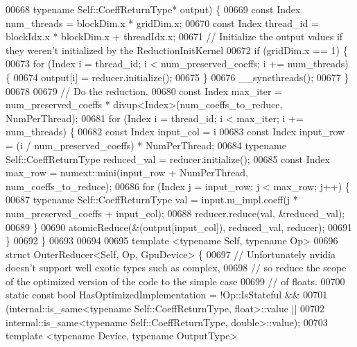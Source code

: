 \begin{DoxyCode}
00668                                      \textcolor{keyword}{typename} Self::CoeffReturnType* output) \{
00669   \textcolor{keyword}{const} Index num\_threads = blockDim.x * gridDim.x;
00670   \textcolor{keyword}{const} Index thread\_id = blockIdx.x * blockDim.x + threadIdx.x;
00671   \textcolor{comment}{// Initialize the output values if they weren't initialized by the ReductionInitKernel}
00672   \textcolor{keywordflow}{if} (gridDim.x == 1) \{
00673     \textcolor{keywordflow}{for} (Index i = thread\_id; i < num\_preserved\_coeffs; i += num\_threads) \{
00674       output[i] = reducer.initialize();
00675     \}
00676     \_\_syncthreads();
00677   \}
00678 
00679   \textcolor{comment}{// Do the reduction.}
00680   \textcolor{keyword}{const} Index max\_iter = num\_preserved\_coeffs * divup<Index>(num\_coeffs\_to\_reduce, NumPerThread);
00681   \textcolor{keywordflow}{for} (Index i = thread\_id; i < max\_iter; i += num\_threads) \{
00682     \textcolor{keyword}{const} Index input\_col = i %
00683     \textcolor{keyword}{const} Index input\_row = (i / num\_preserved\_coeffs) * NumPerThread;
00684     \textcolor{keyword}{typename} Self::CoeffReturnType reduced\_val = reducer.initialize();
00685     \textcolor{keyword}{const} Index max\_row = numext::mini(input\_row + NumPerThread, num\_coeffs\_to\_reduce);
00686     \textcolor{keywordflow}{for} (Index j = input\_row; j < max\_row; j++) \{
00687       \textcolor{keyword}{typename} Self::CoeffReturnType val = input.m\_impl.coeff(j * num\_preserved\_coeffs + input\_col);
00688       reducer.reduce(val, &reduced\_val);
00689     \}
00690     atomicReduce(&(output[input\_col]), reduced\_val, reducer);
00691   \}
00692 \}
00693 
00694 
00695 \textcolor{keyword}{template} <\textcolor{keyword}{typename} Self, \textcolor{keyword}{typename} Op>
00696 \textcolor{keyword}{struct }OuterReducer<Self, Op, GpuDevice> \{
00697   \textcolor{comment}{// Unfortunately nvidia doesn't support well exotic types such as complex,}
00698   \textcolor{comment}{// so reduce the scope of the optimized version of the code to the simple case}
00699   \textcolor{comment}{// of floats.}
00700   \textcolor{keyword}{static} \textcolor{keyword}{const} \textcolor{keywordtype}{bool} HasOptimizedImplementation = !Op::IsStateful &&
00701                                                  (internal::is\_same<typename Self::CoeffReturnType,
       float>::value ||
00702                                                   internal::is\_same<typename Self::CoeffReturnType,
       double>::value);
00703   \textcolor{keyword}{template} <\textcolor{keyword}{typename} Device, \textcolor{keyword}{typename} OutputType>

\end{DoxyCode}
